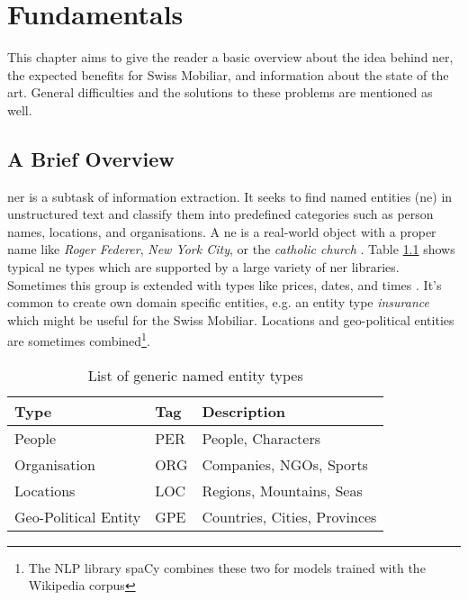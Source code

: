 \chapter{Fundamentals}
\label{chap:ner-overview}

This chapter aims to give the reader a basic overview about the idea behind \acrlong{ner}, the expected benefits for Swiss Mobiliar, and information about the state of the art. General difficulties and the solutions to these problems are mentioned as well.

\section{A Brief Overview}

\acrshort{ner} is a subtask of information extraction. It seeks to find named entities (\acrshort{ne}) in unstructured text and classify them into predefined categories such as person names, locations, and organisations. A \acrlong{ne} is a real-world object with a proper name like \emph{Roger Federer}, \emph{New York City}, or the \emph{catholic church} \cite{wiki02}. Table \ref{tbl:named-entities} shows typical \acrlong{ne} types which are supported by a large variety of \acrshort{ner} libraries. Sometimes this group is extended with types like prices, dates, and times \cite{Jurafsky2000}. It's common to create own domain specific entities, e.g. an entity type \emph{insurance} which might be useful for the Swiss Mobiliar. Locations and geo-political entities are sometimes combined\footnote{The NLP library spaCy combines these two for models trained with the Wikipedia corpus}.

\begin{table}[h!]
    \centering
    \begin{tabular}{|l|l|l|}
        \hline
        \textbf{Type} & \textbf{Tag} & \textbf{Description} \\ [0.5ex]
        \hline
        People & PER & People, Characters \\
        Organisation & ORG & Companies, NGOs, Sports \\
        Locations & LOC & Regions, Mountains, Seas \\
        Geo-Political Entity & GPE & Countries, Cities, Provinces \\ [1ex]
        \hline
    \end{tabular}
    \caption{List of generic named entity types}
    \label{tbl:named-entities}
\end{table}

